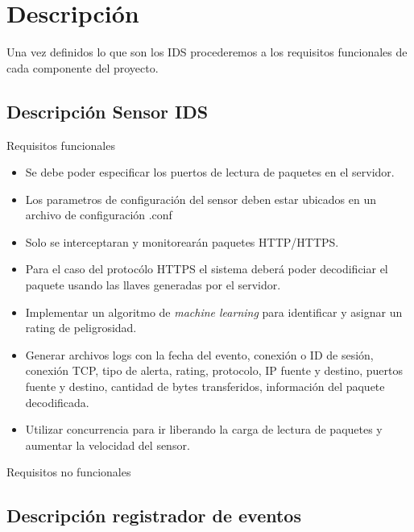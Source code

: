\section{Descripción}

Una vez definidos lo que son los IDS procederemos a los requisitos funcionales de cada componente del proyecto. \\

\subsection{Descripción Sensor IDS}

Requisitos funcionales \\

\begin{itemize}
    \item Se debe poder especificar los puertos de lectura de paquetes en el servidor.
    \item Los parametros de configuración del sensor deben estar ubicados en un archivo de configuración .conf
    \item Solo se interceptaran y monitorearán paquetes HTTP/HTTPS.
    \item Para el caso del protocólo HTTPS el sistema deberá poder decodificiar el paquete usando las llaves generadas por el servidor.
    \item Implementar un algoritmo de \textit{machine learning} para identificar y asignar un rating de peligrosidad.
    \item Generar archivos logs con la fecha del evento, conexión o ID de sesión, conexión TCP, tipo de alerta, rating, protocolo, IP fuente y destino, puertos fuente y destino, cantidad de bytes transferidos, información del paquete decodificada.
    \item Utilizar concurrencia para ir liberando la carga de lectura de paquetes y aumentar la velocidad del sensor.
\end{itemize}

Requisitos no funcionales \\


\subsection{Descripción registrador de eventos}

